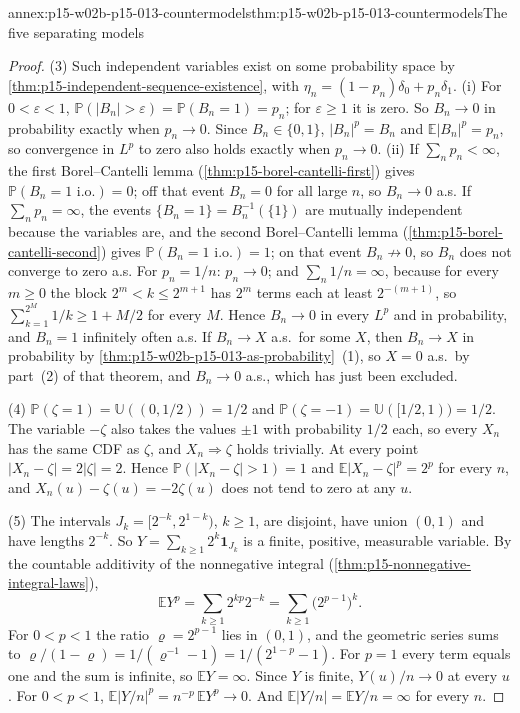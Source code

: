 \begin{annexitem}{annex:p15-w02b-p15-013-countermodels}{thm:p15-w02b-p15-013-countermodels}{The five separating models}
\begin{proof}
(3) Such independent variables exist on some probability space by
\cref{thm:p15-independent-sequence-existence}, with
\(\eta_n=(1-p_n)\delta_0+p_n\delta_1\). (i) For
\(0<\varepsilon<1\), \(\mathbb P(|B_n|>\varepsilon)=\mathbb P(B_n=1)=p_n\);
for \(\varepsilon\geq1\) it is zero. So \(B_n\to0\) in probability
exactly when \(p_n\to0\). Since \(B_n\in\{0,1\}\),
\(|B_n|^p=B_n\) and \(\mathbb E|B_n|^p=p_n\), so convergence in
\(L^p\) to zero also holds exactly when \(p_n\to0\). (ii) If
\(\sum_np_n<\infty\), the first Borel--Cantelli lemma
(\cref{thm:p15-borel-cantelli-first}) gives
\(\mathbb P(B_n=1\text{ i.o.})=0\); off that event \(B_n=0\) for all
large \(n\), so \(B_n\to0\) a.s. If \(\sum_np_n=\infty\), the events
\(\{B_n=1\}=B_n^{-1}(\{1\})\) are mutually independent because the
variables are, and the second Borel--Cantelli lemma
(\cref{thm:p15-borel-cantelli-second}) gives
\(\mathbb P(B_n=1\text{ i.o.})=1\); on that event \(B_n\not\to0\), so
\(B_n\) does not converge to zero a.s. For \(p_n=1/n\): \(p_n\to0\);
and \(\sum_n1/n=\infty\), because for every \(m\geq0\) the block
\(2^m<k\leq2^{m+1}\) has \(2^m\) terms each at least \(2^{-(m+1)}\),
so \(\sum_{k=1}^{2^M}1/k\geq1+M/2\) for every \(M\). Hence \(B_n\to0\)
in every \(L^p\) and in probability, and \(B_n=1\) infinitely often
a.s. If \(B_n\to X\) a.s.\ for some \(X\), then \(B_n\to X\) in
probability by \cref{thm:p15-w02b-p15-013-as-probability}~(1), so
\(X=0\) a.s.\ by part~(2) of that theorem, and \(B_n\to0\) a.s., which
has just been excluded.

(4) \(\mathbb P(\zeta=1)=\mathbb U((0,1/2))=1/2\) and
\(\mathbb P(\zeta=-1)=\mathbb U([1/2,1))=1/2\). The variable
\(-\zeta\) also takes the values \(\pm1\) with probability
\(1/2\) each, so every \(X_n\) has the same CDF as \(\zeta\), and
\(X_n\Rightarrow\zeta\) holds trivially. At every point
\(|X_n-\zeta|=2|\zeta|=2\). Hence
\(\mathbb P(|X_n-\zeta|>1)=1\) and
\(\mathbb E|X_n-\zeta|^p=2^p\) for every \(n\), and
\(X_n(u)-\zeta(u)=-2\zeta(u)\) does not tend to zero at any
\(u\).

(5) The intervals \(J_k=[2^{-k},2^{1-k})\), \(k\geq1\), are disjoint,
have union \((0,1)\) and have lengths \(2^{-k}\). So
\(Y=\sum_{k\geq1}2^k\mathbf1_{J_k}\) is a finite, positive,
measurable variable. By the countable additivity of the nonnegative
integral (\cref{thm:p15-nonnegative-integral-laws}),
\[
 \mathbb EY^p=\sum_{k\geq1}2^{kp}2^{-k}=\sum_{k\geq1}\bigl(2^{p-1}\bigr)^k.
\]
For \(0<p<1\) the ratio \(\varrho=2^{p-1}\) lies in \((0,1)\), and the
geometric series sums to \(\varrho/(1-\varrho)=1/(\varrho^{-1}-1)=
1/(2^{1-p}-1)\). For \(p=1\) every term equals one and the sum is
infinite, so \(\mathbb EY=\infty\). Since \(Y\) is finite,
\(Y(u)/n\to0\) at every \(u\). For \(0<p<1\),
\(\mathbb E|Y/n|^p=n^{-p}\,\mathbb EY^p\to0\). And
\(\mathbb E|Y/n|=\mathbb EY/n=\infty\) for every \(n\).


\end{proof}
\end{annexitem}
